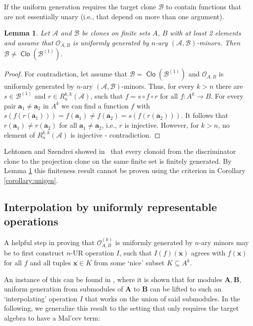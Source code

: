 \documentclass[11pt]{amsart}
\theoremstyle{plain}
\newtheorem{lemma}[thm]{Lemma}
\theoremstyle{definition}
\newcommand{\alg}[1]{\mathbf{#1}}
\newcommand{\clone}[1]{\mathcal{#1}}
\newcommand{\clonoid}[1]{\mathcal{#1}}
\newcommand{\clodO}{\clonoid{O}}
\newcommand{\algA}{\alg{A}}
\newcommand{\algB}{\alg{B}}
\newcommand{\cloA}{\clone{A}}
\newcommand{\cloB}{\clone{B}}
\renewcommand\vec{\mathbf}
\newcommand{\va}{\vec{a}}
\newcommand{\vx}{\vec{x}}
\DeclareMathOperator{\Clo}{\mathsf{Clo}}
\begin{document}
If the uniform generation requires the target clone $\cloB$ to contain functions that are not essentially unary (i.e., that depend on more than one argument).

\begin{lemma} \label{lemma:nonUG}
Let $\cloA$ and $\cloB$ be clones on finite sets $A$, $B$ with at least 2 elements and assume that $\clodO_{A,B}$ is uniformly generated by $n$-ary $(\cloA,\cloB)$-minors. Then $\cloB \neq \Clo(\cloB^{(1)})$. 
\end{lemma}

\begin{proof}
For contradiction, let assume that $\cloB = \Clo(\cloB^{(1)})$ and $\clodO_{A,B}$ is uniformly generated by $n$-ary $(\cloA,\cloB)$-minors. Thus, for every $k > n$ there are $s \in \cloB^{(1)}$ and $r\in R_n^{k,k}(\cloA)$, such that $f = s \circ f \circ r$ for all $f \colon A^k\to B$. For every pair $\va_1 \neq \va_2$ in $A^k$ we can find a function $f$ with $s(f(r(\va_1))) = f(\va_1) \neq f(\va_2) = s(f(r(\va_2)))$. It follows that $r(\va_1) \neq r(\va_2)$ for all $\va_1 \neq \va_2$, i.e., $r$ is injective. However, for $k>n$, no element of $R_n^{k,k}(\cloA)$ is injective - contradiction.
\end{proof}

Lehtonen and Szendrei showed in~\cite{LS-discriminator} that every clonoid from the discriminator clone to the projection clone on the same finite set is finitely generated. By Lemma \ref{lemma:nonUG} this finiteness result cannot be proven using the criterion in Corollary \ref{corollary:unigen}.

\subsection{Interpolation by uniformly representable operations}

A helpful step in proving that $\mathcal O_{A,B}^{(k)}$ is uniformly generated by $n$-ary minors may be to first construct $n$-UR operation $I$, such that $I(f)(\vx)$ agrees with $f(\vx)$ for all $f$ and all tuples $\vx \in K$ from some `nice' subset $K \subseteq A^k$. 

An instance of this can be found in \cite[Lemma 2.14 (3)]{MW-clonoidsmodules}, where it is shown that for modules $\algA,\algB$, uniform generation from submodules of $\algA$ to $\algB$ can be lifted to such an `interpolating' operation $I$ that works on the union of said submodules. In the following, we generalize this result to the setting that only requires the target algebra to have a Mal'cev term:
\end{document}
